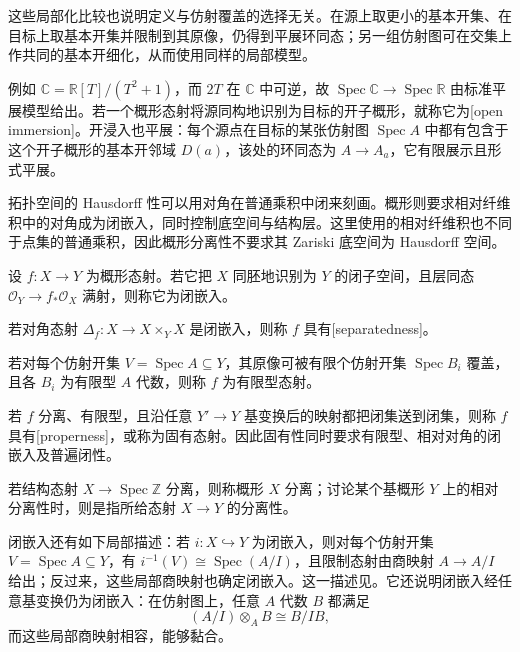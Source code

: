 这些局部化比较也说明定义与仿射覆盖的选择无关。在源上取更小的基本开集、在目标上取基本开集并限制到其原像，仍得到平展环同态；另一组仿射图可在交集上作共同的基本开细化，从而使用同样的局部模型。

\ProseParagraphBreak

例如 \(\mathbb C=\mathbb R[T]/(T^2+1)\)，而 \(2T\) 在 \(\mathbb C\) 中可逆，故 \(\operatorname{Spec}\mathbb C\rightarrow\operatorname{Spec}\mathbb R\) 由标准平展模型给出。若一个概形态射将源同构地识别为目标的开子概形，就称它为[open immersion]。开浸入也平展：每个源点在目标的某张仿射图 \(\operatorname{Spec}A\) 中都有包含于这个开子概形的基本开邻域 \(D(a)\)，该处的环同态为 \(A\rightarrow A_a\)，它有限展示且形式平展。

拓扑空间的 Hausdorff 性可以用对角在普通乘积中闭来刻画。概形则要求相对纤维积中的对角成为闭嵌入，同时控制底空间与结构层。这里使用的相对纤维积也不同于点集的普通乘积，因此概形分离性不要求其 Zariski 底空间为 Hausdorff 空间。

\begin{definition}\label{b3:def:separated-finite-type-proper}\label{b3:def:closed-immersion}\label{b3:def:separated-morphism}\label{b3:def:finite-type-morphism}\label{b3:def:proper-morphism}
	设 \(f:X\rightarrow Y\) 为概形态射。若它把 \(X\) 同胚地识别为 \(Y\) 的闭子空间，且层同态 \(\mathcal O_Y\rightarrow f_*\mathcal O_X\) 满射，则称它为闭嵌入。

	若对角态射 \(\Delta_f:X\rightarrow X\times_YX\) 是闭嵌入，则称 \(f\) 具有[separatedness]。

	若对每个仿射开集 \(V=\operatorname{Spec}A\subseteq Y\)，其原像可被有限个仿射开集 \(\operatorname{Spec}B_i\) 覆盖，且各 \(B_i\) 为有限型 \(A\) 代数，则称 \(f\) 为有限型态射。

	若 \(f\) 分离、有限型，且沿任意 \(Y'\rightarrow Y\) 基变换后的映射都把闭集送到闭集，则称 \(f\) 具有[properness]，或称为固有态射。因此固有性同时要求有限型、相对对角的闭嵌入及普遍闭性。

	若结构态射 \(X\to\operatorname{Spec}\mathbb Z\) 分离，则称概形 \(X\) 分离；讨论某个基概形 \(Y\) 上的相对分离性时，则是指所给态射 \(X\to Y\) 的分离性。
\end{definition}

闭嵌入还有如下局部描述：若 \(i:X\hookrightarrow Y\) 为闭嵌入，则对每个仿射开集 \(V=\operatorname{Spec}A\subseteq Y\)，有 \(i^{-1}(V)\cong\operatorname{Spec}(A/I)\)，且限制态射由商映射 \(A\to A/I\) 给出；反过来，这些局部商映射也确定闭嵌入。这一描述见\cite[Chapter II, Corollary 5.10, p. 116]{Hartshorne1977}。它还说明闭嵌入经任意基变换仍为闭嵌入：在仿射图上，任意 \(A\) 代数 \(B\) 都满足
\[
	(A/I)\otimes_AB\cong B/IB,
\]
而这些局部商映射相容，能够黏合。

